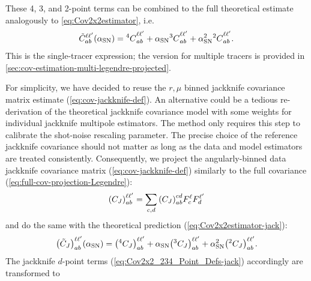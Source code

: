 These 4, 3, and 2-point terms can be combined to the full theoretical estimate analogously to \cref{eq:Cov2x2estimator}, i.e.
\begin{equation} \label{eq:cov2x2_Legendre}
\tilde C_{ab}^{\ell\ell'} \qty(\alpha_{\rm SN}) = {^4C}_{ab}^{\ell\ell'} + \alpha_{\rm SN} {^3C}_{ab}^{\ell\ell'} + \alpha_{\rm SN}^2 {^2C}_{ab}^{\ell\ell'}.
\end{equation}
This is the single-tracer expression; the version for multiple tracers is provided in \cref{sec:cov-estimation-multi-legendre-projected}.

For simplicity, we have decided to reuse the $r,\mu$ binned jackknife covariance matrix estimate (\cref{eq:cov-jackknife-def}).
An alternative could be a tedious re-derivation of the theoretical jackknife covariance model with some weights for individual jackknife multipole estimators.
The method only requires this step to calibrate the shot-noise rescaling parameter.
The precise choice of the reference jackknife covariance should not matter as long as the data and model estimators are treated consistently.
Consequently, we project the angularly-binned data jackknife covariance matrix (\cref{eq:cov-jackknife-def}) similarly to the full covariance (\cref{eq:full-cov-projection-Legendre}):
\begin{equation} \label{eq:jack-cov-projection-Legendre}
    \qty(C_J)_{ab}^{\ell\ell'} = \sum_{c,d} \qty(C_J)_{ab}^{cd} F^\ell_c F^{\ell'}_d
\end{equation}
and do the same with the theoretical prediction (\cref{eq:Cov2x2estimator-jack}):
\begin{equation} \label{eq:Cov2x2estimator-jack-legendre}
\qty(\tilde C_J)_{ab}^{\ell\ell'} \qty(\alpha_{\rm SN}) = \qty(^4C_J)_{ab}^{\ell\ell'} + \alpha_{\rm SN} \qty(^3C_J)_{ab}^{\ell\ell'} + \alpha_{\rm SN}^2 \qty(^2C_J)_{ab}^{\ell\ell'}.
\end{equation}
The jackknife $d$-point terms (\cref{eq:Cov2x2_234_Point_Defs-jack}) accordingly are transformed to
